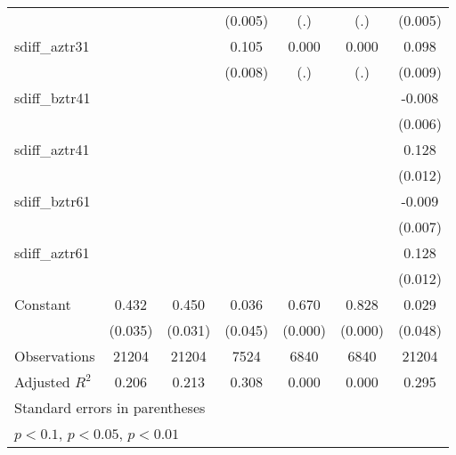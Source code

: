 {\begin{tabular}{l*{6}{c}}
                    &                     &                     &     (0.005)         &         (.)         &         (.)         &     (0.005)         \\
[1em]
sdiff\_aztr31        &                     &                     &       0.105\sym{***}&       0.000         &       0.000         &       0.098\sym{***}\\
                    &                     &                     &     (0.008)         &         (.)         &         (.)         &     (0.009)         \\
[1em]
sdiff\_bztr41        &                     &                     &                     &                     &                     &      -0.008         \\
                    &                     &                     &                     &                     &                     &     (0.006)         \\
[1em]
sdiff\_aztr41        &                     &                     &                     &                     &                     &       0.128\sym{***}\\
                    &                     &                     &                     &                     &                     &     (0.012)         \\
[1em]
sdiff\_bztr61        &                     &                     &                     &                     &                     &      -0.009         \\
                    &                     &                     &                     &                     &                     &     (0.007)         \\
[1em]
sdiff\_aztr61        &                     &                     &                     &                     &                     &       0.128\sym{***}\\
                    &                     &                     &                     &                     &                     &     (0.012)         \\
[1em]
Constant            &       0.432\sym{***}&       0.450\sym{***}&       0.036         &       0.670\sym{***}&       0.828\sym{***}&       0.029         \\
                    &     (0.035)         &     (0.031)         &     (0.045)         &     (0.000)         &     (0.000)         &     (0.048)         \\
\hline
Observations        &       21204         &       21204         &        7524         &        6840         &        6840         &       21204         \\
Adjusted \(R^{2}\)  &       0.206         &       0.213         &       0.308         &       0.000         &       0.000         &       0.295         \\
\hline\hline
\multicolumn{7}{l}{\footnotesize Standard errors in parentheses}\\
\multicolumn{7}{l}{\footnotesize \sym{*} \(p<0.1\), \sym{**} \(p<0.05\), \sym{***} \(p<0.01\)}\\
\end{tabular}
}
